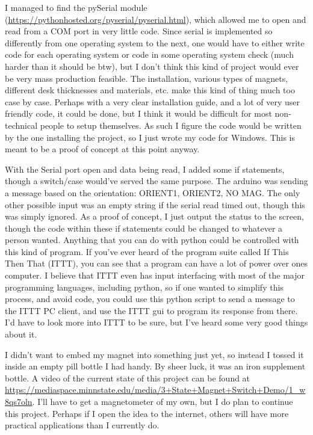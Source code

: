 \documentclass[prb,preprint]{revtex4-1}
\begin{document}
I managed to find the pySerial module (\url{https://pythonhosted.org/pyserial/pyserial.html}), which allowed me to open and read from a COM port in very little code. Since serial is implemented so differently from one operating system to the next, one would have to either write code for each operating system or code in some operating system check (much harder than it should be btw), but I don't think this kind of project would ever be very mass production feasible. The installation, various types of magnets, different desk thicknesses and materials, etc. make this kind of thing much too case by case. Perhaps with a very clear installation guide, and a lot of very user friendly code, it could be done, but I think it would be difficult for most non-technical people to setup themselves. As such I figure the code would be written by the one installing the project, so I just wrote my code for Windows. This is meant to be a proof of concept at this point anyway.

With the Serial port open and data being read, I added some if statements, though a switch/case would've served the same purpose. The arduino was sending a message based on the orientation: ORIENT1, ORIENT2, NO MAG. The only other possible input was an empty string if the serial read timed out, though this was simply ignored. As a proof of concept, I just output the status to the screen, though the code within these if statements could be changed to whatever a person wanted. Anything that you can do with python could be controlled with this kind of program. If you've ever heard of the program suite called If This Then That (ITTT), you can see that a program can have a lot of power over ones computer. I believe that ITTT even has input interfacing with most of the major programming languages, including python, so if one wanted to simplify this process, and avoid code, you could use this python script to send a message to the ITTT PC client, and use the ITTT gui to program its response from there. I'd have to look more into ITTT to be sure, but I've heard some very good things about it. 

I didn't want to embed my magnet into something just yet, so instead I tossed it inside an empty pill bottle I had handy. By sheer luck, it was an iron supplement bottle. A video of the current state of this project can be found at \url{https://mediaspace.minnstate.edu/media/3+State+Magnet+Switch+Demo/1_w8qs7oln}. I'll have to get a magnetometer of my own, but I do plan to continue this project. Perhaps if I open the idea to the internet, others will have more practical applications than I currently do. 

\end{document}
